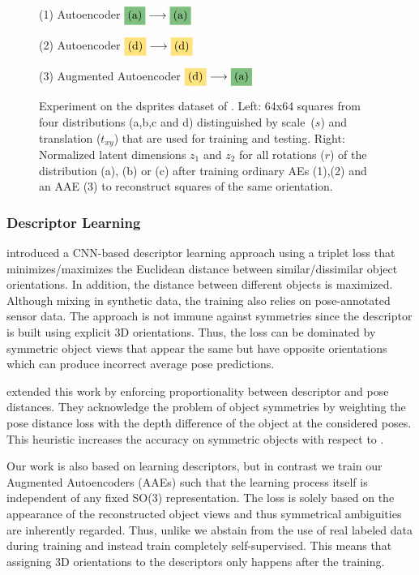 \begin{figure}[t]
\begin{minipage}{0.454\linewidth}
		\resizebox{1.0\linewidth}{!}{
			}
		\caption*{\scriptsize{(1) Autoencoder $\colorbox{darkgreen}{(a)}\longrightarrow \colorbox{darkgreen}{(a)}$ }}
		\resizebox{1.0\linewidth}{!}{
			}
		\caption*{\scriptsize{(2) Autoencoder $\colorbox{darkyellow}{(d)} \longrightarrow \colorbox{darkyellow}{(d)}$}}
		\resizebox{1.0\linewidth}{!}{
			}
		\caption*{\scriptsize{(3) Augmented Autoencoder $\colorbox{darkyellow}{(d)} \longrightarrow \colorbox{darkgreen}{(a)}$}}
	\end{minipage}
	\caption{Experiment on the dsprites dataset of \cite{dsprites17}. Left: 64x64 squares from four distributions (a,b,c and d) distinguished by \mbox{scale ($s$)} and translation ($t_{xy}$) that are used for training and testing. Right: Normalized latent dimensions $z_1$ and $z_2$ for all rotations ($r$) of the distribution (a), (b) or (c) after training ordinary \glspl{AE} (1),(2) and an \gls{AAE} (3) to reconstruct squares of the same orientation.}
	\label{fig:toy}
\end{figure}


\subsubsection{Descriptor Learning}

\cite{wohlhart2015learning} introduced a \gls{CNN}-based descriptor learning approach using a triplet loss that minimizes/maximizes the Euclidean distance between similar/dissimilar object orientations. In addition, the distance between different objects is maximized.
Although mixing in synthetic data, the training also relies on pose-annotated sensor data. The approach is not immune against symmetries since the descriptor is built using explicit 3D orientations. Thus, the loss can be dominated by symmetric object views that appear the same but have opposite orientations which can produce incorrect average pose predictions.


\cite{balntas2017pose} extended this work by enforcing proportionality between descriptor and pose distances. They acknowledge the problem of object symmetries by weighting the pose distance loss with the depth difference of the object at the considered poses. This heuristic increases the accuracy on symmetric objects with respect to \cite{wohlhart2015learning}. 

Our work is also based on learning descriptors, but in contrast we train our Augmented Autoencoders (AAEs) such that the learning process itself is independent of any fixed SO(3) representation. The loss is solely based on the appearance of the reconstructed object views and thus symmetrical ambiguities are inherently regarded. Thus, unlike \cite{balntas2017pose,wohlhart2015learning} we abstain from the use of real labeled data during training and instead train completely self-supervised. This means that assigning 3D orientations to the descriptors only happens after the training.

